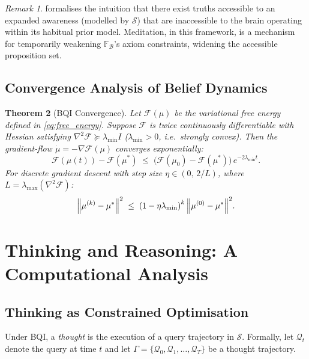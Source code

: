 \documentclass[12pt,a4paper]{article}
\theoremstyle{plain}
\newtheorem{theorem}{Theorem}[section]
\theoremstyle{definition}
\theoremstyle{remark}
\newtheorem{remark}[theorem]{Remark}
\newcommand{\vF}{\mathcal{F}}
\newcommand{\vS}{\mathcal{S}}
\newcommand{\vB}{\mathcal{B}}
\newcommand{\vQ}{\mathcal{Q}}
\begin{document}
\begin{remark}
 formalises the intuition that there exist truths accessible to
an expanded awareness (modelled by $\vS$) that are inaccessible to the brain
operating within its habitual prior model. Meditation, in this framework, is a mechanism for temporarily weakening $\mathbb{F}_\vB$'s axiom constraints, widening the accessible proposition set.
\end{remark}

\subsection{Convergence Analysis of Belief Dynamics}

\begin{theorem}[BQI Convergence]
Let $\vF(\mu)$ be the variational free energy defined in \cref{eq:free_energy}.
Suppose $\vF$ is twice continuously differentiable with Hessian satisfying
$\nabla^2 \vF \succeq \lambda_{\min} I$ ($\lambda_{\min} > 0$, i.e.\ strongly convex).
Then the gradient-flow $\dot\mu = -\nabla \vF(\mu)$ converges exponentially:
\begin{equation}
  \vF(\mu(t)) - \vF(\mu^*) \;\leq\; \bigl(\vF(\mu_0) - \vF(\mu^*)\bigr)\,e^{-2\lambda_{\min} t}.
  \label{eq:convergence}
\end{equation}
For discrete gradient descent with step size $\eta \in (0,\,2/L)$, where $L = \lambda_{\max}(\nabla^2\vF)$:
\begin{equation}
  \norm{\mu^{(k)} - \mu^*}^2 \;\leq\; \left(1 - \eta\lambda_{\min}\right)^k \norm{\mu^{(0)} - \mu^*}^2.
\end{equation}
\end{theorem}

\section{Thinking and Reasoning: A Computational Analysis}
\label{sec:thinking}

\subsection{Thinking as Constrained Optimisation}

Under BQI, a \emph{thought} is the execution of a query trajectory in $\vS$.
Formally, let $\vQ_t$ denote the query at time $t$ and let
$\Gamma = \{\vQ_0, \vQ_1, \ldots, \vQ_T\}$ be a thought trajectory.
\end{document}
